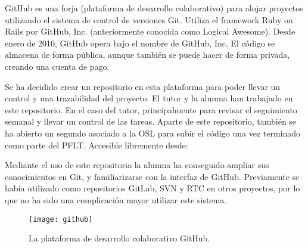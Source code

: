 GitHub es una forja (plataforma de desarrollo colaborativo) para alojar proyectos utilizando el sistema de control de versiones Git. Utiliza el framework Ruby on Rails por GitHub, Inc. (anteriormente conocida como Logical Awesome). Desde enero de 2010, GitHub opera bajo el nombre de GitHub, Inc. El código se almacena de forma pública, aunque también se puede hacer de forma privada, creando una cuenta de pago.


Se ha decidido crear un repositorio en esta plataforma para poder llevar un control y una trazabilidad del proyecto. El tutor y la alumna han trabajado en este repositorio. En el caso del tutor, principalmente para revisar el seguimiento semanal y llevar un control de las tareas. Aparte de este repositorio, también se ha abierto un segundo asociado a la OSL para subir el código una vez terminado como parte del PFLT. Accesible libremente desde: \cite{URL::repositorioAplicacion}


Mediante el uso de este repositorio la alumna ha conseguido ampliar sus conocimientos en Git, y familiarizarse con la interfaz de GitHub. Previamente se había utilizado como repositorios GitLab, SVN y RTC en otros proyectos, por lo que no ha sido una complicación mayor utilizar este sistema.


\begin{figure}[h]
	\centering
	\texttt{[image: github]}
	\caption{La plataforma de desarrollo colaborativo GitHub.}
	\label{fig:github}
\end{figure}